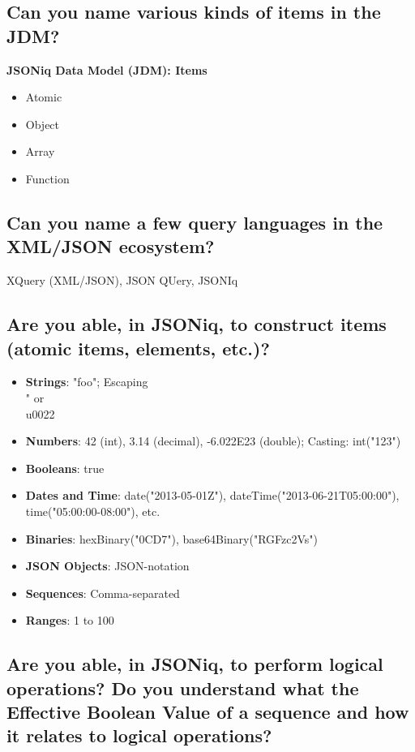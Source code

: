\documentclass{article}
\begin{document}
\subsection{Can you name various kinds of items in the JDM?}

\textbf{JSONiq Data Model (JDM): Items}

\begin{itemize}
    \item Atomic
    \item Object 
    \item Array 
    \item Function 
\end{itemize}

\subsection{Can you name a few query languages in the XML/JSON ecosystem?}

XQuery (XML/JSON), JSON QUery, JSONIq

\subsection{Are you able, in JSONiq, to construct items (atomic items, elements, etc.)?}

\begin{itemize}
    \item \textbf{Strings}: "foo"; Escaping \\" or \\u0022
    \item \textbf{Numbers}: 42 (int), 3.14 (decimal), -6.022E23 (double); Casting: int("123")
    \item \textbf{Booleans}: true
    \item \textbf{Dates and Time}: date("2013-05-01Z"), dateTime("2013-06-21T05:00:00"), time("05:00:00-08:00"), etc.
    \item \textbf{Binaries}: hexBinary("0CD7"), base64Binary("RGFzc2Vs")
    \item \textbf{JSON Objects}: JSON-notation
    \item \textbf{Sequences}: Comma-separated
    \item \textbf{Ranges}: 1 to 100
\end{itemize}

\subsection{Are you able, in JSONiq, to perform logical operations? Do you understand what the Effective Boolean Value of a sequence and how it relates to logical operations?}
\end{document}
